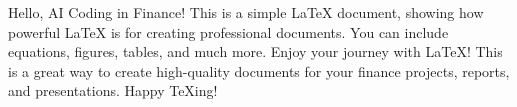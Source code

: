 \documentclass{article}
\begin{document}
Hello, AI Coding in Finance! This is a simple LaTeX document, showing how powerful LaTeX is for creating professional documents. You can include equations, figures, tables, and much more. Enjoy your journey with LaTeX! This is a great way to create high-quality documents for your finance projects, reports, and presentations. Happy TeXing!
\end{document}

